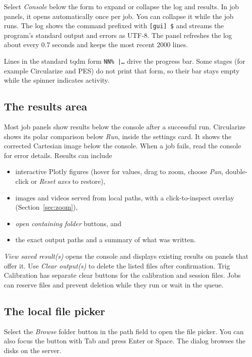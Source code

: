 \documentclass[11pt,a4paper]{article}
\newcommand{\code}[1]{\texttt{#1}}
\begin{document}
Select \emph{Console} below the form to expand or collapse the log and results.
In job panels, it opens automatically once per job. You can collapse it
while the job runs. The log shows the command prefixed with \code{[gui] \$}
and streams the program's standard output and errors as UTF-8. The panel
refreshes the log about every 0.7 seconds and keeps the most recent 2000 lines.

Lines in the standard tqdm form \code{NN\% |\ldots} drive the progress
bar. Some stages (for example Circularize and PES) do not print that form,
so their bar stays empty while the spinner indicates activity.

\subsection{The results area}
\label{sec:results}

Most job panels show results below the console after a successful run.
Circularize shows its polar comparison below \emph{Run}, inside the settings
card. It shows the corrected Cartesian image below the console.
When a job fails, read the console for error details. Results can include

\begin{itemize}
  \item interactive Plotly figures (hover for values, drag to zoom, choose
        \emph{Pan}, double-click or \emph{Reset axes} to restore),
  \item images and videos served from local paths, with a click-to-inspect
        overlay (Section~\ref{sec:zoom}),
  \item \emph{open containing folder} buttons, and
  \item the exact output paths and a summary of what was written.
\end{itemize}

\emph{View saved result(s)} opens the console and displays existing results
on panels that offer it.
Use \emph{Clear output(s)} to delete the listed files after confirmation.
Trig Calibration has separate clear buttons for the calibration and session
files. Jobs can reserve files and
prevent deletion while they run or wait in the queue.

\subsection{The local file picker}
\label{sec:picker}

Select the \emph{Browse} folder button in the path field to open the file
picker. You can also focus the button with Tab and press Enter or Space.
The dialog browses the disks on the server.
\end{document}
